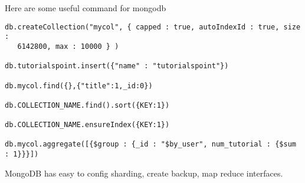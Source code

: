 Here are some useful command for mongodb
\begin{lstlisting}
db.createCollection("mycol", { capped : true, autoIndexId : true, size :
   6142800, max : 10000 } )

db.tutorialspoint.insert({"name" : "tutorialspoint"})

db.mycol.find({},{"title":1,_id:0})

db.COLLECTION_NAME.find().sort({KEY:1})

db.COLLECTION_NAME.ensureIndex({KEY:1})

db.mycol.aggregate([{$group : {_id : "$by_user", num_tutorial : {$sum : 1}}}])
\end{lstlisting}

MongoDB has easy to config sharding, create backup, map reduce interfaces.
